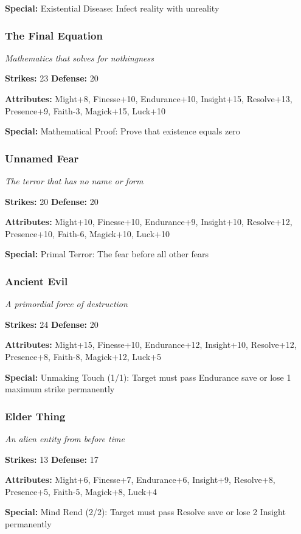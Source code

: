\documentclass[10pt,twoside]{article}
\begin{document}
\textbf{Special:} Existential Disease: Infect reality with unreality

\subsubsection{The Final Equation}
\textit{Mathematics that solves for nothingness}

\textbf{Strikes:} 23 \quad \textbf{Defense:} 20

\textbf{Attributes:} Might+8, Finesse+10, Endurance+10, Insight+15, Resolve+13, Presence+9, Faith-3, Magick+15, Luck+10

\textbf{Special:} Mathematical Proof: Prove that existence equals zero

\subsubsection{Unnamed Fear}
\textit{The terror that has no name or form}

\textbf{Strikes:} 20 \quad \textbf{Defense:} 20

\textbf{Attributes:} Might+10, Finesse+10, Endurance+9, Insight+10, Resolve+12, Presence+10, Faith-6, Magick+10, Luck+10

\textbf{Special:} Primal Terror: The fear before all other fears

\subsubsection{Ancient Evil}
\textit{A primordial force of destruction}

\textbf{Strikes:} 24 \quad \textbf{Defense:} 20

\textbf{Attributes:} Might+15, Finesse+10, Endurance+12, Insight+10, Resolve+12, Presence+8, Faith-8, Magick+12, Luck+5

\textbf{Special:} Unmaking Touch (1/1): Target must pass Endurance save or lose 1 maximum strike permanently

\subsubsection{Elder Thing}
\textit{An alien entity from before time}

\textbf{Strikes:} 13 \quad \textbf{Defense:} 17

\textbf{Attributes:} Might+6, Finesse+7, Endurance+6, Insight+9, Resolve+8, Presence+5, Faith-5, Magick+8, Luck+4

\textbf{Special:} Mind Rend (2/2): Target must pass Resolve save or lose 2 Insight permanently
\end{document}
